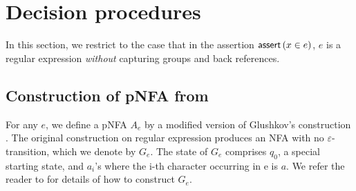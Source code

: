 
\section{Decision procedures}

In this section, we restrict to the case that in the assertion $\textsf{assert}\left(x \in e\right)$, $e$ is a regular expression \emph{without} capturing groups and back references.

\subsection{Construction of pNFA from \regexp[\sf CG]}
\label{construction:pnfa}

For any \regexp[\sf CG] $e$, we define a pNFA $A_e$ by a modified version of
Glushkov's construction \cite{Gluskov61}. The original construction on regular expression
produces an NFA with no $\varepsilon$-transition, which we denote by $G_e$.
The state of $G_e$ comprises $q_0$, a special starting state, and $a_i$'s
where the i-th character occurring in e is $a$. We refer the reader to \cite{Gluskov61} for 
details of how to construct $G_e$.

